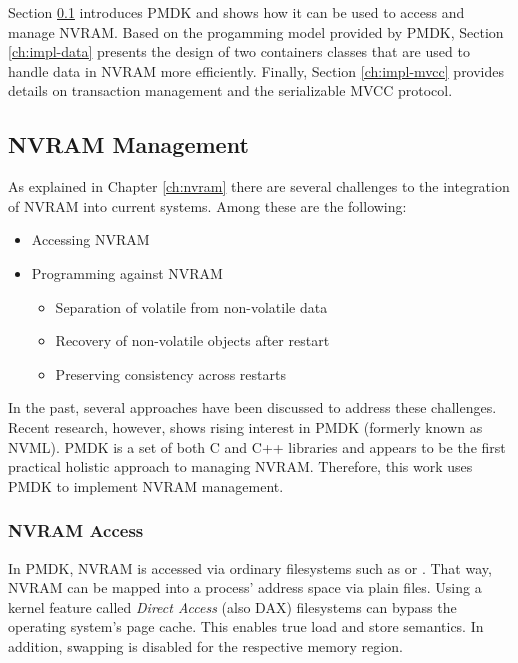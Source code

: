 Section \ref{ch:impl-nvram} introduces PMDK and shows how it can be used to
access and manage NVRAM. Based on the progamming model provided by PMDK, Section
\ref{ch:impl-data} presents the design of two containers classes that are used
to handle data in NVRAM more efficiently. Finally, Section \ref{ch:impl-mvcc}
provides details on transaction management and the serializable MVCC protocol.

\subsection{NVRAM Management}
\label{ch:impl-nvram}

As explained in Chapter \ref{ch:nvram} there are several challenges to the
integration of NVRAM into current systems. Among these are the following:

\begin{itemize}
    \item Accessing NVRAM
    \item Programming against NVRAM
    \begin{itemize}
        \item Separation of volatile from non-volatile data
        \item Recovery of non-volatile objects after restart
        \item Preserving consistency across restarts
    \end{itemize}
\end{itemize}

In the past, several approaches have been discussed to address these challenges.
Recent research, however, shows rising interest in PMDK (formerly known as
NVML). PMDK is a set of both C and C++ libraries and appears to be the first
practical holistic approach to managing NVRAM. Therefore, this work uses PMDK to
implement NVRAM management.

\subsubsection{NVRAM Access}

In PMDK, NVRAM is accessed via ordinary filesystems such as  or
. That way, NVRAM can be mapped into a process' address space via
plain files. Using a kernel feature called \emph{Direct Access} (also DAX)
filesystems can bypass the operating system's page cache. This enables true load
and store semantics. In addition, swapping is disabled for the respective memory
region.

